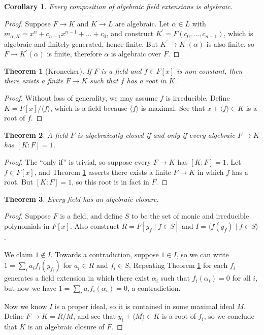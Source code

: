 \documentclass[
    parskip=half,
    toc=flat,
    toc=sectionentrydotfill,
]{scrartcl}  %
\theoremstyle{definition}
\theoremstyle{plain}
\newtheorem{theorem}{Theorem}[section]
\newtheorem{corollary}{Corollary}[theorem]
\theoremstyle{remark}
\begin{document}
\begin{corollary}
    Every composition of algebraic field extensions is algebraic.
\end{corollary}

\begin{proof}
    Suppose $F\to K$ and $K\to L$ are algebraic.
    Let $\alpha\in L$ with $m_{\alpha,K}=x^n+c_{n-1}x^{n-1}+\dots+c_0$, and construct $K^\prime=F(c_0,\dots,c_{n-1})$,
    which is algebraic and finitely generated, hence finite.
    But $K^\prime\to K^\prime(\alpha)$ is also finite, so $F\to K^\prime(\alpha)$ is finite, therefore $\alpha$ is
    algebraic over $F$.
\end{proof}

\begin{theorem}[Kronecker]
    \label{thm:Kronecker}
    If $F$ is a field and $f\in F[x]$ is non-constant, then there exists a finite $F\to K$ such that $f$ has a root in
    $K$.
\end{theorem}

\begin{proof}
    Without loss of generality, we may assume $f$ is irreducible.
    Define $K=F[x]/\langle f\rangle$, which is a field because $\langle f\rangle$ is maximal.
    See that $x+\langle f\rangle\in K$ is a root of $f$.
\end{proof}

\begin{theorem}
    A field $F$ is algebraically closed if and only if every algebraic $F\to K$ has $[K:F]=1$.
\end{theorem}

\begin{proof}
    The ``only if'' is trivial, so suppose every $F\to K$ has $[K:F]=1$.
    Let $f\in F[x]$, and Theorem \ref{thm:Kronecker} asserts there exists a finite $F\to K$ in which $f$ has a root.
    But $[K:F]=1$, so this root is in fact in $F$.
\end{proof}

\begin{theorem}
    Every field has an algebraic closure.
\end{theorem}

\begin{proof}
    Suppose $F$ is a field, and define $S$ to be the set of monic and irreducible polynomials in $F[x]$.
    Also construct $R=F[y_f\mid f\in S]$ and $I=\langle f(y_f)\mid f\in S\rangle$.

    We claim $1\notin I$.
    Towards a contradiction, suppose $1\in I$, so we can write $1=\sum_ia_if_i(y_{f_i})$ for $a_i\in R$ and $f_i\in S$.
    Repeating Theorem \ref{thm:Kronecker} for each $f_i$ generates a field extension in which there exist $\alpha_i$
    such that $f_i(\alpha_i)=0$ for all $i$, but now we have $1=\sum_ia_if_i(\alpha_i)=0$, a contradiction.

    Now we know $I$ is a proper ideal, so it is contained in some maximal ideal $M$.
    Define $F\to K=R/M$, and see that $y_i+\langle M\rangle\in K$ is a root of $f_i$, so we conclude that $K$ is an
    algebraic closure of $F$.
\end{proof}
\end{document}
